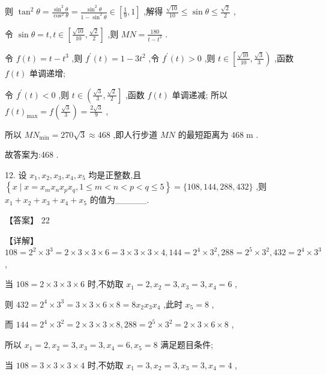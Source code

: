 \documentclass[10pt]{article}
\begin{document}
则 \({\tan }^{2}\theta  = \frac{{\sin }^{2}\theta }{{\cos }^{2}\theta } = \frac{{\sin }^{2}\theta }{1 - {\sin }^{2}\theta } \in  \left\lbrack  {\frac{1}{9},1}\right\rbrack\) ,解得 \(\frac{\sqrt{10}}{10} \leq  \sin \theta  \leq  \frac{\sqrt{2}}{2}\) ,

令 \(\sin \theta  = t,t \in  \left\lbrack  {\frac{\sqrt{10}}{10},\frac{\sqrt{2}}{2}}\right\rbrack\) ,则 \({MN} = \frac{180}{t - {t}^{3}}\) .

令 \(f\left( t\right)  = t - {t}^{3}\) ,则 \({f}^{\prime }\left( t\right)  = 1 - 3{t}^{2}\) ,令 \({f}^{\prime }\left( t\right)  > 0\) ,则 \(t \in  \left\lbrack  {\frac{\sqrt{10}}{10},\frac{\sqrt{3}}{3}}\right)\) ,函数 \(f\left( t\right)\) 单调递增;

令 \({f}^{\prime }\left( t\right)  < 0\) ,则 \(t \in  \left( {\frac{\sqrt{3}}{3},\frac{\sqrt{2}}{2}}\right\rbrack\) ,函数 \(f\left( t\right)\) 单调递减; 所以 \(f{\left( t\right) }_{\max } = f\left( \frac{\sqrt{3}}{3}\right)  = \frac{2\sqrt{3}}{9}\) ,

所以 \(M{N}_{\min } = {270}\sqrt{3} \approx  {468}\) ,即人行步道 \({MN}\) 的最短距离为 \({468}\mathrm{\;m}\) .

故答案为:468 .

12. 设 \({x}_{1},{x}_{2},{x}_{3},{x}_{4},{x}_{5}\) 均是正整数,且 \(\left\{  {x \mid  x = {x}_{m}{x}_{n}{x}_{p}{x}_{q},1 \leq  m < n < p < q \leq  5}\right\}   = \{ {108},{144},{288},{432}\}\) ,则 \({x}_{1} + {x}_{2} + {x}_{3} + {x}_{4} + {x}_{5}\) 的值为\_\_\_\_\_.

【答案】 22

【详解】 \({108} = {2}^{2} \times  {3}^{3} = 2 \times  3 \times  3 \times  6 = 3 \times  3 \times  3 \times  4,{144} = {2}^{4} \times  {3}^{2},{288} = {2}^{5} \times  {3}^{2},{432} = {2}^{4} \times  {3}^{3}\) ,

当 \({108} = 2 \times  3 \times  3 \times  6\) 时,不妨取 \({x}_{1} = 2,{x}_{2} = 3,{x}_{3} = 3,{x}_{4} = 6\) ,

则 \({432} = {2}^{4} \times  {3}^{3} = 3 \times  3 \times  6 \times  8 = 8{x}_{2}{x}_{3}{x}_{4}\) ,此时 \({x}_{5} = 8\) ,

而 \({144} = {2}^{4} \times  {3}^{2} = 2 \times  3 \times  3 \times  8,{288} = {2}^{5} \times  {3}^{2} = 2 \times  3 \times  6 \times  8\) ,

所以 \({x}_{1} = 2,{x}_{2} = 3,{x}_{3} = 3,{x}_{4} = 6,{x}_{5} = 8\) 满足题目条件;

当 \({108} = 3 \times  3 \times  3 \times  4\) 时,不妨取 \({x}_{1} = 3,{x}_{2} = 3,{x}_{3} = 3,{x}_{4} = 4\) ,
\end{document}
